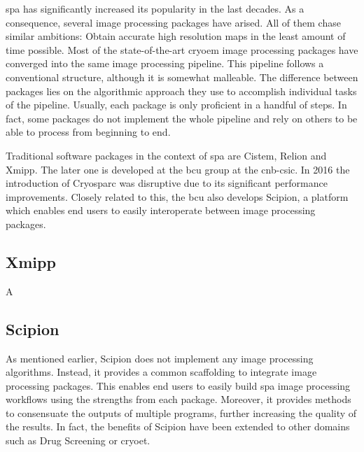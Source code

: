 \documentclass[../main.tex]{subfiles}
\begin{document}
\Gls{spa} has significantly increased its popularity in the last decades. As a consequence, several image processing packages have arised. All of them chase similar ambitions: Obtain accurate high resolution maps in the least amount of time possible. Most of the state-of-the-art \gls{cryoem} image processing packages have converged into the same image processing pipeline. This pipeline follows a conventional structure, although it is somewhat malleable. The difference between packages lies on the algorithmic approach they use to accomplish individual tasks of the pipeline. Usually, each package is only proficient in a handful of steps. In fact, some packages do not implement the whole pipeline and rely on others to be able to process from beginning to end.

Traditional software packages in the context of \gls{spa} are Cistem\cite{grigorieff2018}, Relion\cite{scheres2021} and Xmipp\cite{sorzano2004}. The later one is developed at the \gls{bcu} group at the \gls{cnb}-\gls{csic}. In 2016 the introduction of Cryosparc\cite{cryosparc} was disruptive due to its significant performance improvements. Closely related to this, the \gls{bcu} also develops Scipion\cite{delarosa2016}, a platform which enables end users to easily interoperate between image processing packages.

\subsection{Xmipp}
A

\subsection{Scipion}
As mentioned earlier, Scipion does not implement any image processing algorithms. Instead, it provides a common scaffolding to integrate image processing packages. This enables end users to easily build \gls{spa} image processing workflows using the strengths from each package. Moreover, it provides methods to consensuate the outputs of multiple programs, further increasing the quality of the results. In fact, the benefits of Scipion have been extended to other domains such as Drug Screening\cite{scipion_chem} or \gls{cryoet}\cite{jimenezdelamorena2021}.
\end{document}
